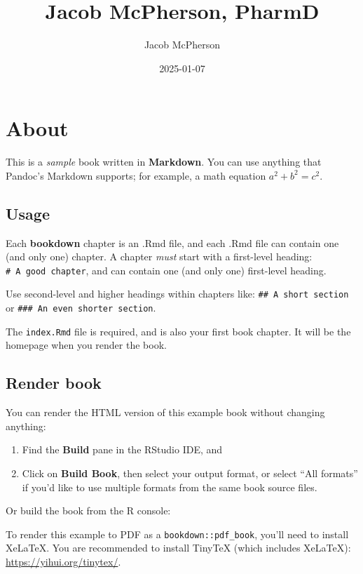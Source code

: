 \documentclass[
]{book}
\title{Jacob McPherson, PharmD}
\author{Jacob McPherson}
\date{2025-01-07}
\begin{document}
\maketitle

{
\setcounter{tocdepth}{1}
\tableofcontents
}
\chapter{About}\label{about}

This is a \emph{sample} book written in \textbf{Markdown}. You can use anything that Pandoc's Markdown supports; for example, a math equation \(a^2 + b^2 = c^2\).

\section{Usage}\label{usage}

Each \textbf{bookdown} chapter is an .Rmd file, and each .Rmd file can contain one (and only one) chapter. A chapter \emph{must} start with a first-level heading: \texttt{\#\ A\ good\ chapter}, and can contain one (and only one) first-level heading.

Use second-level and higher headings within chapters like: \texttt{\#\#\ A\ short\ section} or \texttt{\#\#\#\ An\ even\ shorter\ section}.

The \texttt{index.Rmd} file is required, and is also your first book chapter. It will be the homepage when you render the book.

\section{Render book}\label{render-book}

You can render the HTML version of this example book without changing anything:

\begin{enumerate}
\def\labelenumi{\arabic{enumi}.}
\item
  Find the \textbf{Build} pane in the RStudio IDE, and
\item
  Click on \textbf{Build Book}, then select your output format, or select ``All formats'' if you'd like to use multiple formats from the same book source files.
\end{enumerate}

Or build the book from the R console:

To render this example to PDF as a \texttt{bookdown::pdf\_book}, you'll need to install XeLaTeX. You are recommended to install TinyTeX (which includes XeLaTeX): \url{https://yihui.org/tinytex/}.
\end{document}
